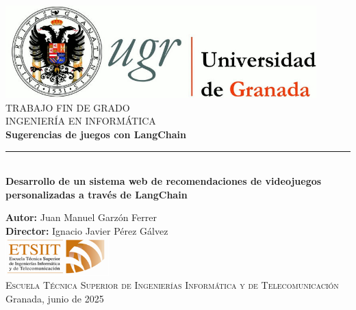 \begin{titlepage}
\centering
\includegraphics[width=0.9\textwidth]{imagenes/logo_ugr.jpg}\\[1.4cm]

\textsc{\Large TRABAJO FIN DE GRADO}\\[0.2cm]
\textsc{INGENIERÍA EN INFORMÁTICA}\\[1cm]
{\Huge\bfseries Sugerencias de juegos con LangChain}\\
\noindent\rule[-1ex]{\textwidth}{3pt}\\[3.5ex]
{\large\bfseries Desarrollo de un sistema web de recomendaciones de videojuegos personalizadas a través de LangChain}

\vspace{2.5cm}

\textbf{Autor:} Juan Manuel Garzón Ferrer\\[0.5cm]
\textbf{Director:} Ignacio Javier Pérez Gálvez\\[2cm]

\includegraphics[width=0.3\textwidth]{imagenes/etsiit_logo.png}\\[0.1cm]
\textsc{Escuela Técnica Superior de Ingenierías Informática y de Telecomunicación}\\
Granada, junio de 2025
\end{titlepage}

\cleardoublepage 
